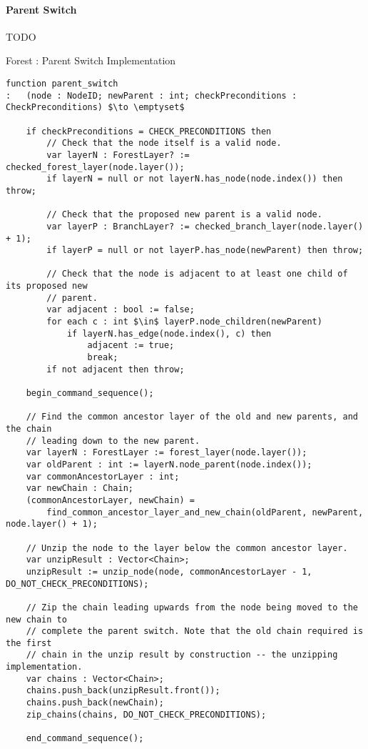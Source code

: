 \paragraph{Parent Switch}

TODO

\begin{stulisting}[p]
\caption{Forest : Parent Switch Implementation}
\label{code:ipfs-forest-parentswitch}
\begin{lstlisting}[style=Default]
function parent_switch
:	(node : NodeID; newParent : int; checkPreconditions : CheckPreconditions) $\to \emptyset$

	if checkPreconditions = CHECK_PRECONDITIONS then
		// Check that the node itself is a valid node.
		var layerN : ForestLayer? := checked_forest_layer(node.layer());
		if layerN = null or not layerN.has_node(node.index()) then throw;

		// Check that the proposed new parent is a valid node.
		var layerP : BranchLayer? := checked_branch_layer(node.layer() + 1);
		if layerP = null or not layerP.has_node(newParent) then throw;

		// Check that the node is adjacent to at least one child of its proposed new
		// parent.
		var adjacent : bool := false;
		for each c : int $\in$ layerP.node_children(newParent)
			if layerN.has_edge(node.index(), c) then
				adjacent := true;
				break;
		if not adjacent then throw;

	begin_command_sequence();

	// Find the common ancestor layer of the old and new parents, and the chain
	// leading down to the new parent.
	var layerN : ForestLayer := forest_layer(node.layer());
	var oldParent : int := layerN.node_parent(node.index());
	var commonAncestorLayer : int;
	var newChain : Chain;
	(commonAncestorLayer, newChain) =
		find_common_ancestor_layer_and_new_chain(oldParent, newParent, node.layer() + 1);

	// Unzip the node to the layer below the common ancestor layer.
	var unzipResult : Vector<Chain>;
	unzipResult := unzip_node(node, commonAncestorLayer - 1, DO_NOT_CHECK_PRECONDITIONS);

	// Zip the chain leading upwards from the node being moved to the new chain to
	// complete the parent switch. Note that the old chain required is the first
	// chain in the unzip result by construction -- the unzipping implementation.
	var chains : Vector<Chain>;
	chains.push_back(unzipResult.front());
	chains.push_back(newChain);
	zip_chains(chains, DO_NOT_CHECK_PRECONDITIONS);

	end_command_sequence();
\end{lstlisting}
\end{stulisting}


